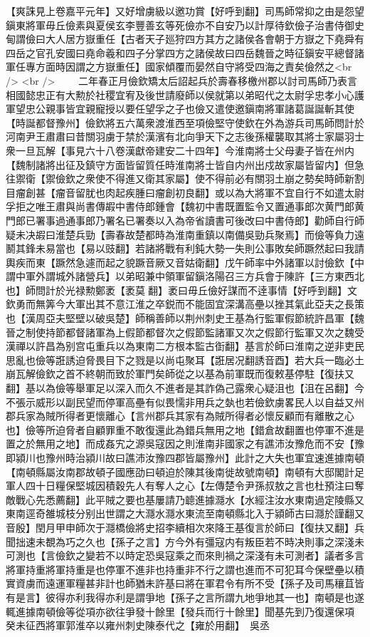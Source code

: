 【爽誅見上卷嘉平元年】又好增虜級以邀功賞【好呼到翻】司馬師常抑之由是怨望鎭東將軍毋丘儉素與夏侯玄李豐善玄等死儉亦不自安乃以計厚待欽儉子治書侍御史甸謂儉曰大人居方嶽重任【古者天子廵狩四方其方之諸侯各會朝于方嶽之下堯舜有四岳之官孔安國曰堯命羲和四子分掌四方之諸侯故曰四岳魏晉之時征鎭安平總督諸軍任專方面時因謂之方嶽重任】國家傾覆而晏然自守將受四海之責矣儉然之<br />
<br />
　　二年春正月儉欽矯太后詔起兵於壽春移檄州郡以討司馬師乃表言相國懿忠正有大勲於社稷宜宥及後世請廢師以侯就第以弟昭代之太尉孚忠孝小心護軍望忠公親事皆宜親寵授以要任望孚之子也儉又遣使邀鎭南將軍諸葛誕誕斬其使【時誕都督豫州】儉欽將五六萬衆渡淮西至項儉堅守使欽在外為游兵司馬師問計於河南尹王肅肅曰昔關羽虜于禁於漢濱有北向爭天下之志後孫權襲取其將士家屬羽士衆一旦瓦解【事見六十八卷漢獻帝建安二十四年】今淮南將士父母妻子皆在州内【魏制諸將出征及鎮守方面皆留質任時淮南將士皆自内州出戍故家屬皆留内】但急往禦衛【禦儉欽之衆使不得進又衛其家屬】使不得前必有關羽土崩之勢矣時師新割目瘤創甚【瘤音留肬也肉起疾腫曰瘤創初良翻】或以為大將軍不宜自行不如遣太尉孚拒之唯王肅與尚書傳嘏中書侍郎鍾會【魏初中書既置監令又置通事郎次黄門郎黄門郎已署事過通事郎乃署名已署奏以入為帝省讀書可後改曰中書侍郎】勸師自行師疑未决嘏曰淮楚兵勁【壽春故楚都時為淮南重鎮以南備吳勁兵聚焉】而儉等負力遠鬭其鋒未易當也【易以豉翻】若諸將戰有利鈍大勢一失則公事敗矣師蹶然起曰我請輿疾而東【蹶然急遽而起之貌蹶音厥又音姑衛翻】戊午師率中外諸軍以討儉欽【中謂中軍外謂城外諸營兵】以弟昭兼中領軍留鎭洛陽召三方兵會于陳許【三方東西北也】師問計於光禄勲鄭袤【袤莫翻】袤曰毋丘儉好謀而不逹事情【好呼到翻】文欽勇而無筭今大軍出其不意江淮之卒鋭而不能固宜深溝高壘以挫其氣此亞夫之長策也【漢周亞夫堅壁以破吳楚】師稱善師以荆州刺史王基為行監軍假節統許昌軍【魏晉之制使持節都督諸軍為上假節都督次之假節監諸軍又次之假節行監軍又次之魏受漢禪以許昌為别宫屯重兵以為東南二方根本監古衘翻】基言於師曰淮南之逆非吏民思亂也儉等誑誘迫脅畏目下之戮是以尚屯聚耳【誑居况翻誘音酉】若大兵一臨必土崩瓦解儉欽之首不終朝而致於軍門矣師從之以基為前軍既而復敕基停駐【復扶又翻】基以為儉等舉軍足以深入而久不進者是其詐偽己露衆心疑沮也【沮在呂翻】今不張示威形以副民望而停軍高壘有似畏懦非用兵之埶也若儉欽虜畧民人以自益又州郡兵家為賊所得者更懷離心【言州郡兵其家有為賊所得者必懷反顧而有離散之心也】儉等所迫脅者自顧罪重不敢復還此為錯兵無用之地【錯倉故翻置也停軍不進是置之於無用之地】而成姦宄之源吳寇因之則淮南非國家之有譙沛汝豫危而不安【豫即潁川也豫州時治潁川故曰譙沛汝豫四郡皆屬豫州】此計之大失也軍宜速進據南頓【南頓縣屬汝南郡故頓子國應劭曰頓迫於陳其後南徙故號南頓】南頓有大邸閣計足軍人四十日糧保堅城因積穀先人有奪人之心【左傳楚令尹孫叔敖之言也杜預注曰奪敵戰心先悉薦翻】此平賊之要也基屢請乃聼進據㶏水【水經注汝水東南過定陵縣又東南逕奇雒城枝分别出世謂之大㶏水㶏水東流至南頓縣北入于潁師古曰㶏於謹翻又音殷】閏月甲申師次于㶏橋儉將史招李續相次來降王基復言於師曰【復扶又翻】兵聞拙速未覩為巧之久也【孫子之言】方今外有彊寇内有叛臣若不時决則事之深淺未可測也【言儉欽之變若不以時定恐吳寇乘之而來則禍之深淺有未可測者】議者多言將軍持重將軍持重是也停軍不進非也持重非不行之謂也進而不可犯耳今保壁壘以積實資虜而遠運軍糧甚非計也師猶未許基曰將在軍君令有所不受【孫子及司馬穰苴皆有是言】彼得亦利我得亦利是謂爭地【孫子之言所謂九地爭地其一也】南頓是也遂輒進據南頓儉等從項亦欲往爭發十餘里【發兵而行十餘里】聞基先到乃復還保項　癸未征西將軍郭淮卒以雍州刺史陳泰代之【雍於用翻】　吳丞